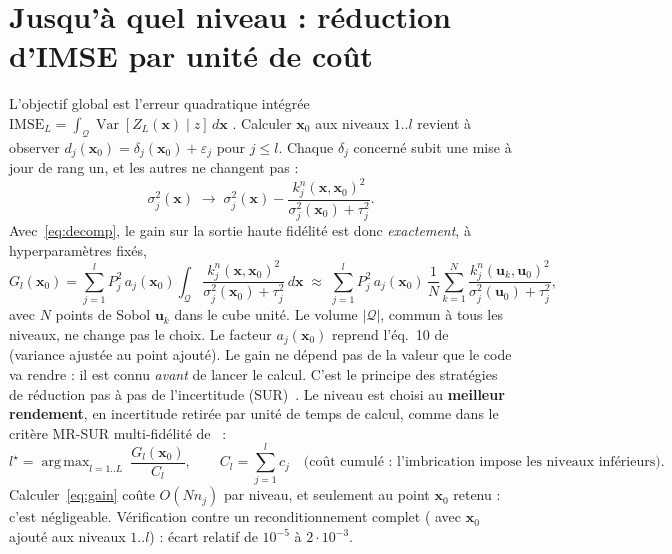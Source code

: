 \documentclass[10pt,a4paper]{article}
\theoremstyle{plain}
\newcommand{\vx}{\bm{x}}
\newcommand{\vu}{\bm{u}}
\newcommand{\Q}{\mathcal{Q}}
\DeclareMathOperator{\Var}{Var}
\DeclareMathOperator*{\argmax}{arg\,max}
\begin{document}
\section{Jusqu'à quel niveau : réduction d'IMSE par unité de coût}\label{sec:niveau}
L'objectif global est l'erreur quadratique intégrée $\mathrm{IMSE}_L=\int_\Q\Var[Z_L(\vx)\mid z]\,d\vx$
\cite{SWMW89}. Calculer $\vx_0$ aux niveaux $1..l$ revient à observer $d_j(\vx_0)=\delta_j(\vx_0)+\varepsilon_j$
pour $j\le l$. Chaque $\delta_j$ concerné subit une mise à jour de rang un, et les autres ne changent pas :
\[
  \sigma_j^2(\vx)\;\longrightarrow\;\sigma_j^2(\vx)-\frac{k_j^n(\vx,\vx_0)^2}{\sigma_j^2(\vx_0)+\tau_j^2}.
\]
Avec~\eqref{eq:decomp}, le gain sur la sortie haute fidélité est donc \emph{exactement}, à hyperparamètres fixés,
\begin{equation}\label{eq:gain}
  G_l(\vx_0)=\sum_{j=1}^{l}P_j^2\,a_j(\vx_0)\int_\Q\frac{k_j^n(\vx,\vx_0)^2}{\sigma_j^2(\vx_0)+\tau_j^2}\,d\vx
  \;\approx\;\sum_{j=1}^{l}P_j^2\,a_j(\vx_0)\,\frac{1}{N}\sum_{k=1}^{N}
  \frac{k_j^n(\vu_k,\vu_0)^2}{\sigma_j^2(\vu_0)+\tau_j^2},
\end{equation}
avec $N$ points de Sobol $\vu_k$ dans le cube unité. Le volume $|\Q|$, commun à tous les niveaux, ne change
pas le choix. Le facteur $a_j(\vx_0)$ reprend l'éq.~10 de~\cite{LGC15} (variance ajustée au point ajouté).
Le gain ne dépend pas de la valeur que le code va rendre : il est connu \emph{avant} de lancer le calcul.
C'est le principe des stratégies de réduction pas à pas de l'incertitude (SUR)~\cite{Bect12}. Le niveau est
choisi au \textbf{meilleur rendement}, en incertitude retirée par unité de temps de calcul, comme dans le
critère MR-SUR multi-fidélité de~\cite{Stroh22} :
\begin{equation}\label{eq:regle}
  l^\star=\argmax_{l=1..L}\ \frac{G_l(\vx_0)}{C_l},\qquad C_l=\sum_{j=1}^{l}c_j
  \quad\text{(coût cumulé : l'imbrication impose les niveaux inférieurs).}
\end{equation}
Calculer~\eqref{eq:gain} coûte $O(N n_j)$ par niveau, et seulement au point $\vx_0$ retenu : c'est
négligeable. Vérification contre un reconditionnement complet ( avec $\vx_0$ ajouté
aux niveaux $1..l$) : écart relatif de $10^{-5}$ à $2\cdot10^{-3}$.
\end{document}
